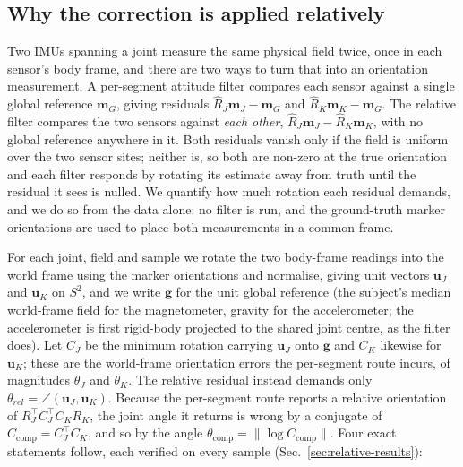 %
%

\subsection{Why the correction is applied relatively}
\label{sec:relative-correction}

Two IMUs spanning a joint measure the same physical field twice, once in each sensor's body
frame, and there are two ways to turn that into an orientation measurement. A per-segment
attitude filter compares each sensor against a single global reference $\mathbf{m}_G$, giving
residuals $\hat{R}_J \mathbf{m}_J - \mathbf{m}_G$ and $\hat{R}_K \mathbf{m}_K - \mathbf{m}_G$.
The relative filter compares the two sensors against \emph{each other},
$\hat{R}_J \mathbf{m}_J - \hat{R}_K \mathbf{m}_K$, with no global reference anywhere in it.
Both residuals vanish only if the field is uniform over the two sensor sites; neither is, so
both are non-zero at the true orientation and each filter responds by rotating its estimate away
from truth until the residual it sees is nulled. We quantify how much rotation each residual
demands, and we do so from the data alone: no filter is run, and the ground-truth marker
orientations are used to place both measurements in a common frame.

For each joint, field and sample we rotate the two body-frame readings into the world frame
using the marker orientations and normalise, giving unit vectors $\mathbf{u}_J$ and
$\mathbf{u}_K$ on $S^2$, and we write $\mathbf{g}$ for the unit global reference (the subject's
median world-frame field for the magnetometer, gravity for the accelerometer; the accelerometer
is first rigid-body projected to the shared joint centre, as the filter does). Let $C_J$ be the
minimum rotation carrying $\mathbf{u}_J$ onto $\mathbf{g}$ and $C_K$ likewise for
$\mathbf{u}_K$; these are the world-frame orientation errors the per-segment route incurs, of
magnitudes $\theta_J$ and $\theta_K$. The relative residual instead demands only
$\theta_{rel} = \angle(\mathbf{u}_J,\mathbf{u}_K)$. Because the per-segment route reports a
relative orientation of $R_J^{\top} C_J^{\top} C_K R_K$, the joint angle it returns is wrong by
a conjugate of $C_{\mathrm{comp}} = C_J^{\top} C_K$, and so by the angle
$\theta_{\mathrm{comp}} = \lVert \log C_{\mathrm{comp}} \rVert$. Four exact statements follow,
each verified on every sample (Sec.~\ref{sec:relative-results}):

